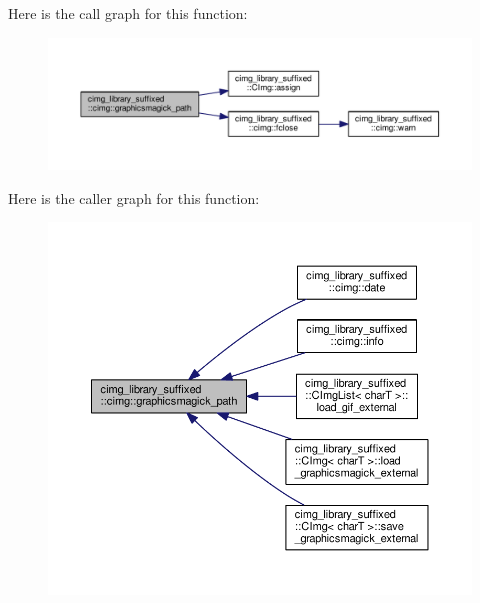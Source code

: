 Here is the call graph for this function\+:
\nopagebreak
\begin{figure}[H]
\begin{center}
\leavevmode
\includegraphics[width=350pt]{d4/d9b/namespacecimg__library__suffixed_1_1cimg_ab4063d8fb2c2564596f33f4a75436f76_cgraph}
\end{center}
\end{figure}
Here is the caller graph for this function\+:
\nopagebreak
\begin{figure}[H]
\begin{center}
\leavevmode
\includegraphics[width=350pt]{d4/d9b/namespacecimg__library__suffixed_1_1cimg_ab4063d8fb2c2564596f33f4a75436f76_icgraph}
\end{center}
\end{figure}
\mbox{\label{namespacecimg__library__suffixed_1_1cimg_a7b4390d7bec2ffbf27d108f1c3a699e0}} 
